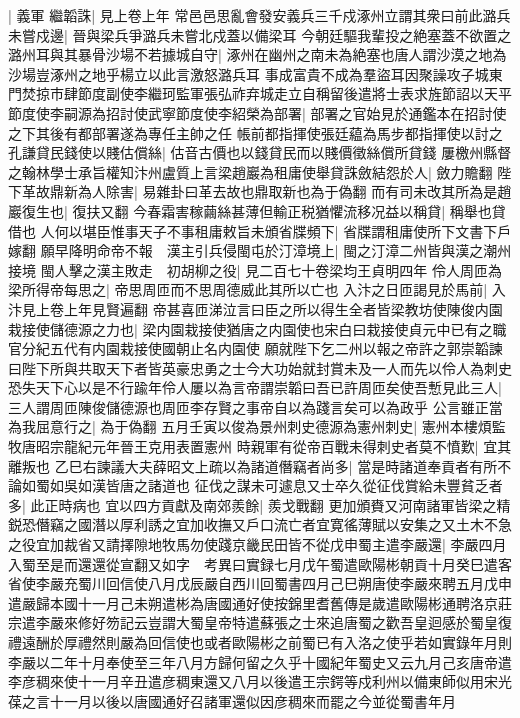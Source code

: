 |{
	義軍}
繼韜誅|{
	見上卷上年}
常邑邑思亂會發安義兵三千戍涿州立謂其衆曰前此潞兵未嘗戍邊|{
	晉與梁兵爭潞兵未嘗北戍蓋以備梁耳}
今朝廷驅我輩投之絶塞蓋不欲置之潞州耳與其暴骨沙場不若據城自守|{
	涿州在幽州之南未為絶塞也唐人謂沙漠之地為沙場豈涿州之地乎楊立以此言激怒潞兵耳}
事成富貴不成為羣盜耳因聚譟攻子城東門焚掠市肆節度副使李繼珂監軍張弘祚弃城走立自稱留後遣將士表求旌節詔以天平節度使李嗣源為招討使武寧節度使李紹榮為部署|{
	部署之官始見於通鑑本在招討使之下其後有都部署遂為專任主帥之任}
帳前都指揮使張廷藴為馬步都指揮使以討之　孔謙貸民錢使以賤估償絲|{
	估音古價也以錢貸民而以賤價徵絲償所貸錢}
屢檄州縣督之翰林學士承旨權知汴州盧質上言梁趙巖為租庸使舉貸誅斂結怨於人|{
	斂力贍翻}
陛下革故鼎新為人除害|{
	易雜卦曰革去故也鼎取新也為于偽翻}
而有司未改其所為是趙巖復生也|{
	復扶又翻}
今春霜害稼繭絲甚薄但輸正税猶懼流移况益以稱貸|{
	稱舉也貸借也}
人何以堪臣惟事天子不事租庸敕旨未頒省牒頻下|{
	省牒謂租庸使所下文書下戶嫁翻}
願早降明命帝不報　漢主引兵侵閩屯於汀漳境上|{
	閩之汀漳二州皆與漢之潮州接境}
閩人擊之漢主敗走　初胡柳之役|{
	見二百七十卷梁均王貞明四年}
伶人周匝為梁所得帝每思之|{
	帝思周匝而不思周德威此其所以亡也}
入汴之日匝謁見於馬前|{
	入汴見上卷上年見賢遍翻}
帝甚喜匝涕泣言曰臣之所以得生全者皆梁教坊使陳俊内園栽接使儲德源之力也|{
	梁内園栽接使猶唐之内園使也宋白曰栽接使貞元中已有之職官分紀五代有内園栽接使國朝止名内園使}
願就陛下乞二州以報之帝許之郭崇韜諫曰陛下所與共取天下者皆英豪忠勇之士今大功始就封賞未及一人而先以伶人為刺史恐失天下心以是不行踰年伶人屢以為言帝謂崇韜曰吾已許周匝矣使吾慙見此三人|{
	三人謂周匝陳俊儲德源也周匝李存賢之事帝自以為踐言矣可以為政乎}
公言雖正當為我屈意行之|{
	為于偽翻}
五月壬寅以俊為景州刺史德源為憲州刺史|{
	憲州本樓煩監牧唐昭宗龍紀元年晉王克用表置憲州}
時親軍有從帝百戰未得刺史者莫不憤歎|{
	宜其離叛也}
乙巳右諫議大夫薛昭文上疏以為諸道僭竊者尚多|{
	當是時諸道奉貢者有所不論如蜀如吳如漢皆唐之諸道也}
征伐之謀未可遽息又士卒久從征伐賞給未豐貧乏者多|{
	此正時病也}
宜以四方貢獻及南郊羨餘|{
	羨戈戰翻}
更加頒賚又河南諸軍皆梁之精鋭恐僭竊之國潛以厚利誘之宜加收撫又戶口流亡者宜寛徭薄賦以安集之又土木不急之役宜加裁省又請擇隙地牧馬勿使踐京畿民田皆不從戊申蜀主遣李嚴還|{
	李嚴四月入蜀至是而還還從宣翻又如字　考異曰實録七月戊午蜀遣歐陽彬朝貢十月癸巳遣客省使李嚴充蜀川回信使八月戊辰嚴自西川回蜀書四月己巳朔唐使李嚴來聘五月戊申遣嚴歸本國十一月己未朔遣彬為唐國通好使按錦里耆舊傳是歲遣歐陽彬通聘洛京莊宗遣李嚴來修好笏記云豈謂大蜀皇帝特遣蘇張之士來追唐蜀之歡吾皇迴感於蜀皇復禮遠酬於厚禮然則嚴為回信使也或者歐陽彬之前蜀已有入洛之使乎若如實錄年月則李嚴以二年十月奉使至三年八月方歸何留之久乎十國紀年蜀史又云九月己亥唐帝遣李彦稠來使十一月辛丑遣彦稠東還又八月以後遣王宗鍔等戍利州以備東師似用宋光葆之言十一月以後以唐國通好召諸軍還似因彦稠來而罷之今並從蜀書年月}
